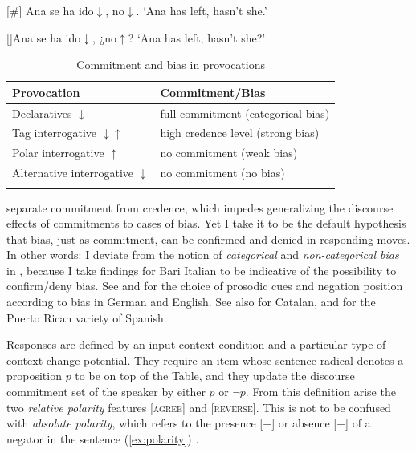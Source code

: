 \begin{exe}
\ex \label{ex:fallingtaginterrogative}
\begin{xlist}[A:]
	[\#]{
	Ana se ha ido$\downarrow$, no$\downarrow$.
	\glt `Ana has left, hasn't she.'}
\end{xlist}

\ex \label{ex:taginterrogative} 
\begin{xlist}[A:]
	[]{Ana se ha ido$\downarrow$, ¿no$\uparrow$? 
	\glt `Ana has left, hasn't she?'}
\end{xlist}
\end{exe}

\begin{table}
\begin{tabular}{ll}
	\lsptoprule
	Provocation & Commitment/Bias\\\midrule
	Declaratives $\downarrow$ & full commitment (categorical bias)\\
	Tag interrogative $\downarrow \uparrow$ & high credence level (strong bias)\\
	Polar interrogative $\uparrow$& no commitment (weak bias)\\
	Alternative interrogative $\downarrow$ & no commitment (no bias) \\
	\lspbottomrule 
\end{tabular}
\caption{Commitment and bias in provocations\label{tab:biasedprovocations}}
\end{table}

\citet{FarkasRoelofsen.2017} separate commitment from credence, which impedes generalizing the discourse effects of commitments to cases of bias. Yet I take it to be the default hypothesis that bias, just as commitment, can be confirmed and denied in responding moves. In other words: I deviate from the notion of \textit{categorical} and \textit{non-categorical bias} in \citet[92]{FarkasBruce.2010}, because I take findings for Bari Italian \citep{GriceSavino.2004} to be indicative of the possibility to confirm/deny bias. See \citet{DomaneschiRomeroBraun.2017} and \citet{DeheBraun.2019} for the choice of prosodic cues and negation position according to bias in German and English. See also \citet{Vanrell.2011} for Catalan, and \citet{Armstrong.2017} for the Puerto Rican variety of Spanish.

Responses are defined by an input context condition and a particular type of context change potential. They require an item whose sentence radical denotes a proposition $p$ to be on top of the Table, and they update the discourse commitment set of the speaker by either $p$ or $\neg p$. From this definition arise the two \textit{relative polarity} features [\textsc{agree}] and [\textsc{reverse}]. This is not to be confused with \textit{absolute polarity}, which refers to the presence [$-$] or absence [$+$] of a negator in the sentence (\ref{ex:polarity}) \citep[106--109]{FarkasBruce.2010}.

